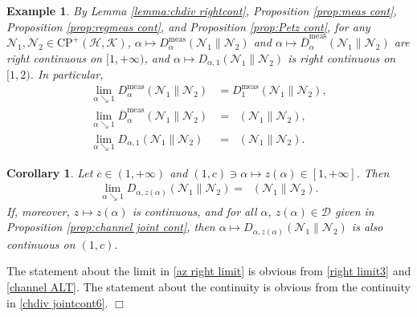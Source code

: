 \documentclass[unsortedaddress,superscriptaddress,pra,notitlepage]{revtex4}
\newtheorem{cor}[definition]{Corollary}
\newtheorem{example}[definition]{Example}
\newenvironment{proof}[1][Proof]{\begin{trivlist}
\item[\hskip \labelsep {\bfseries #1}]}{\hfill$\Box$\end{trivlist}}
\def\D{{\mathcal D}}
\def\N{\mathcal{N}}
\def\hil{{\mathcal H}}
\def\kil{{\mathcal K}}
\def\oll{\overline}
\def\CP{\mathrm{CP}}
\def\meas{\mathrm{meas}}
\DeclareMathOperator{\DU}{\mathit{D}^{Um}}
\begin{document}
\begin{example}\label{ex:rightcont}
By Lemma \ref{lemma:chdiv rightcont}, 
Proposition \ref{prop:meas cont}, Proposition \ref{prop:regmeas cont}, and 
Proposition \ref{prop:Petz cont},
for any $\N_1,\N_2\in\CP^+(\hil,\kil)$,
$\alpha\mapsto D_{\alpha}^{\meas}(\N_1\|\N_2)$ 
and
$\alpha\mapsto \oll{D}_{\alpha}^{\meas}(\N_1\|\N_2)$ 
are right continuous on $[1,+\infty)$, and
$\alpha\mapsto D_{\alpha,1}(\N_1\|\N_2)$ 
is right continuous on $[1,2)$.
In particular,
\begin{align}
\lim_{\alpha\searrow 1}D_{\alpha}^{\meas}(\N_1\|\N_2)&=D_1^{\meas}(\N_1\|\N_2),
\label{right limit1}\\
\lim_{\alpha\searrow 1}\oll{D}_{\alpha}^{\meas}(\N_1\|\N_2)&=\DU(\N_1\|\N_2),
\label{right limit2}\\
\lim_{\alpha\searrow 1}D_{\alpha,1}(\N_1\|\N_2)&=\DU(\N_1\|\N_2).
\label{right limit3}
\end{align}
\end{example}

\begin{cor}\label{cor:az rightcont at1}
Let $c\in(1,+\infty)$ and $(1,c)\ni\alpha\mapsto z(\alpha)\in[1,+\infty]$.
Then
\begin{align}
\lim_{\alpha\searrow 1}D_{\alpha,z(\alpha)}(\N_1\|\N_2)=\DU(\N_1\|\N_2).
\label{az right limit}
\end{align}
If, moreover, $z\mapsto z(\alpha)$ is continuous, and
for all $\alpha$, $z(\alpha)\in\D$ given in 
Proposition \ref{prop:channel joint cont}, then 
$\alpha\mapsto D_{\alpha,z(\alpha)}(\N_1\|\N_2)$ is also continuous on $(1,c)$. 
\end{cor}
\begin{proof}
The statement about the limit in \eqref{az right limit}
is obvious from 
\eqref{right limit3} and \eqref{channel ALT}.
The statement about the continuity is obvious from the continuity in 
\eqref{chdiv jointcont6}.
\end{proof}
\end{document}
